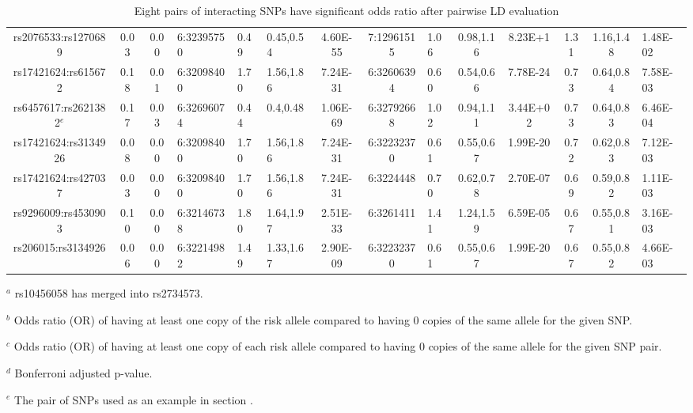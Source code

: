 \documentclass[preprint,12pt,3p]{elsarticle}
\begin{document}
\begin{sidewaystable}
\begin{center}
\begin{tabularx}{\textwidth}{|c|c|c|p{1.16cm}|p{0.8cm}|p{1.16cm}|c|c|p{0.8cm} |c|c|c|c|p{1cm}||}
 rs2076533:rs1270689      & 0.03 & 0.00 & 6:32395750  & 0.49 & 0.45,0.54 & 4.60E-55 & 7:12961515 & 1.06 & 0.98,1.16 &  8.23E+1& 1.31 & 1.16,1.48 & 1.48E-02 \\
 rs17421624:rs615672      & 0.18 & 0.01 & 6:32098400  & 1.70 & 1.56,1.86 & 7.24E-31 & 6:32606394 & 0.60 & 0.54,0.66 &  7.78E-24& 0.73 & 0.64,0.84 & 7.58E-03 \\
 rs6457617:rs2621382$^e$      & 0.17 & 0.03 & 6:32696074  & 0.44 & 0.4,0.48  & 1.06E-69 & 6:32792668 & 1.02 & 0.94,1.11 &  3.44E+02& 0.73 & 0.64,0.83 & 6.46E-04 \\
 rs17421624:rs3134926     & 0.08 & 0.00 & 6:32098400  & 1.70 & 1.56,1.86 & 7.24E-31 & 6:32232370 & 0.61 & 0.55,0.67 &  1.99E-20& 0.72 & 0.62,0.83 & 7.12E-03 \\
 rs17421624:rs427037      & 0.03 & 0.00 & 6:32098400  & 1.70 & 1.56,1.86 & 7.24E-31 & 6:3224448  & 0.70 & 0.62,0.78 &  2.70E-07& 0.69 & 0.59,0.82 & 1.11E-03  \\
rs9296009:rs4530903       & 0.10 & 0.00 & 6:32146738  & 1.80 & 1.64,1.97 & 2.51E-33 & 6:3261411  & 1.41 & 1.24,1.59 &  6.59E-05& 0.67 & 0.55,0.81 & 3.16E-03  \\
rs206015:rs3134926        & 0.06 & 0.00 & 6:32214982  & 1.49 & 1.33,1.67 & 2.90E-09 & 6:32232370 & 0.61 & 0.55,0.67 &  1.99E-20& 0.67 & 0.55,0.82 & 4.66E-03  \\
\hline
\end{tabularx}
 \end{center}
 \caption{Eight pairs of interacting SNPs have significant odds ratio after pairwise LD evaluation}
 \label{table:eight.pairs}
 \begin{tablenotes}%
 \item $^{a}$ rs10456058 has merged into rs2734573.
 \item $^{b}$  Odds ratio (OR) of having at least one copy of the risk allele compared to having 0 copies of the same allele for the given SNP.
 \item $^{c}$  Odds ratio (OR) of having at least one copy of each risk allele compared to having 0 copies of the same allele for the given SNP pair.
 \item $^{d}$  Bonferroni adjusted p-value.
 \item $^e$   The pair of SNPs used as an example in section \label{section:A_linear_model_example}.
 \end{tablenotes}
\end{sidewaystable}
\end{document}
